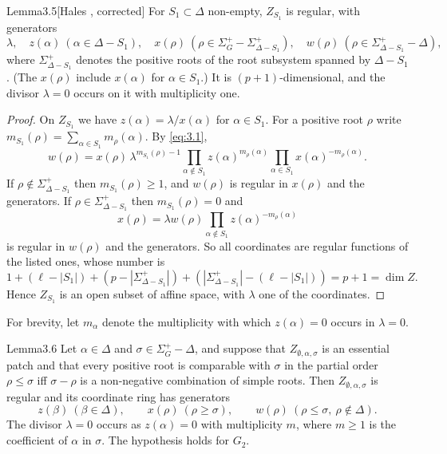 \documentclass[12pt,letterpaper]{amsart}
\theoremstyle{plain}
\theoremstyle{definition}
\theoremstyle{remark}
\theoremstyle{definition}
\begin{document}
\begin{res}{Lemma}{3.5}[Hales \cite{Ha92a}, corrected]\label{res:3.5}
For $S_1\subset \Delta$ non-empty, $Z_{S_1}$ is regular, with
generators
\[
\lambda,\quad z(\alpha)\ (\alpha\in\Delta -S_1),\quad
x(\rho)\ (\rho\in\Sigma_G^+-\Sigma_{\Delta-S_1}^+),\quad
w(\rho)\ (\rho\in \Sigma_{\Delta-S_1}^+-\Delta),
\]
where $\Sigma_{\Delta-S_1}^+$ denotes the positive roots of the
root subsystem spanned by $\Delta-S_1$. (The $x(\rho)$ include
$x(\alpha)$ for $\alpha\in S_1$.) It is
$(p+1)$-dimensional, and the divisor $\lambda =0$ occurs on it with
multiplicity one.
\end{res}

\begin{proof}
On $Z_{S_1}$ we have $z(\alpha)=\lambda/x(\alpha)$ for $\alpha\in S_1$. For a
positive root $\rho$ write $m_{S_1}(\rho)=\sum_{\alpha\in S_1}m_\rho(\alpha)$.
By \eqref{eq:3.1},
\[
w(\rho)=x(\rho)\,\lambda^{m_{S_1}(\rho)-1}\prod_{\alpha\notin S_1}
z(\alpha)^{m_\rho(\alpha)}\prod_{\alpha\in S_1}x(\alpha)^{-m_\rho(\alpha)}.
\]
If $\rho\notin\Sigma^+_{\Delta-S_1}$ then $m_{S_1}(\rho)\geq1$, and $w(\rho)$
is regular in $x(\rho)$ and the generators. If $\rho\in\Sigma^+_{\Delta-S_1}$
then $m_{S_1}(\rho)=0$ and
\[
x(\rho)=\lambda w(\rho)\prod_{\alpha\notin S_1}z(\alpha)^{-m_\rho(\alpha)}
\]
is regular in $w(\rho)$ and the generators.
So all coordinates are regular functions of the listed ones, whose number is
\[
1+(\ell-|S_1|)+(p-|\Sigma^+_{\Delta-S_1}|)+(|\Sigma^+_{\Delta-S_1}|-(\ell-|S_1|))
=p+1=\dim Z.
\]
Hence $Z_{S_1}$ is an open subset of affine space, with $\lambda$
one of the coordinates.
\end{proof}

For brevity, let $m_\alpha$ denote the multiplicity with
which $z(\alpha)=0$ occurs in $\lambda =0$.

\begin{res}{Lemma}{3.6}\label{res:3.6}
Let $\alpha\in\Delta$ and
$\sigma\in\Sigma_G^+ -\Delta$, and suppose that
$Z_{\emptyset,\alpha,\sigma}$ is an essential patch and that every positive
root is comparable with $\sigma$ in the partial order $\rho\le\sigma$ iff
$\sigma-\rho$ is a non-negative combination of simple roots. Then
$Z_{\emptyset,\alpha,\sigma}$ is regular and its coordinate ring has
generators
\[
z(\beta )\ (\beta\in\Delta ),\qquad
x(\rho)\ (\rho \geq\sigma),\qquad
w(\rho)\ (\rho \leq \sigma,\ \rho\notin\Delta).
\]
The divisor $\lambda =0$ occurs as $z(\alpha)=0$
with multiplicity $m$, where $m\geq 1$ is the coefficient of
$\alpha$ in $\sigma$. The hypothesis holds for $G_2$.
\end{res}
\end{document}
